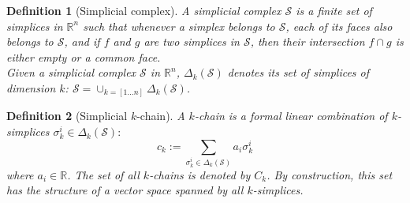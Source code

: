 \documentclass{elsarticle}
\newtheorem{definition}{Definition}
\newcommand{\bbR}{\mathbb{R}}
\begin{document}
\begin{definition}[Simplicial complex]
A simplicial complex $\mathcal{S}$ is a finite set  of simplices in $\bbR^n$ such that whenever a simplex belongs to $\mathcal{S}$, each of its faces also belongs to $\mathcal{S}$, and if $f$ and $g$ are two simplices in $\mathcal{S}$, then their intersection $f \cap g$ is either empty or a common face. \\

\noindent Given a  simplicial complex $\mathcal{S}$ in $\bbR^n$, $\Delta_k(\mathcal{S})$ denotes its set of simplices of dimension $k$:
$\mathcal{S}=\cup_{k=[1\dots n]} \Delta_k(\mathcal{S})$.
\end{definition}

  

\begin{definition}[Simplicial $k$-chain]
A $k$-chain is a formal linear combination of $k$-simplices $\sigma_k^i
\in \Delta_k(\mathcal{S}):$
\begin{equation}
c_k := \sum_{\sigma_k^i
\in \Delta_k(\mathcal{S})} a_i \sigma_k^i
\end{equation}
where $a_i \in \mathbb{R}$. The set of all
$k$-chains is denoted by $C_k$. By construction, this set has the structure of a vector space spanned by all $k$-simplices.
\end{definition}
\end{document}
